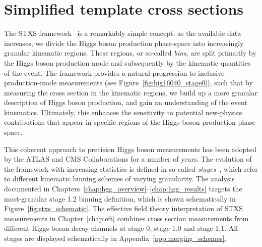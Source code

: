 \section{Simplified template cross sections}\label{sec:theory_stxs}
The STXS framework~\cite{deFlorian:2016spz} is a remarkably simple concept: as the available data increases, we divide the Higgs boson production phase-space into increasingly granular kinematic regions. These regions, or so-called \textit{bins}, are split primarily by the Higgs boson production mode and subsequently by the kinematic quantities of the event. The framework provides a natural progression to inclusive production-mode measurements (see Figure~\ref{fig:hig16040_stage0}), such that by measuring the cross section in the kinematic regions, we build up a more granular description of Higgs boson production, and gain an understanding of the event kinematics. Ultimately, this enhances the sensitivity to potential new-physics contributions that appear in specific regions of the Higgs boson production phase-space.

This coherent approach to precision Higgs boson measurements has been adopted by the ATLAS and CMS Collaborations for a number of years. The evolution of the framework with increasing statistics is defined in so-called \textit{stages}~\cite{deFlorian:2016spz,Berger:2019wnu}, which refer to different kinematic binning schemes of varying granularity. The \Hgg analysis documented in Chapters~\ref{chap:hgg_overview}--\ref{chap:hgg_results} targets the most-granular stage 1.2 binning definition, which is shown schematically in Figure~\ref{fig:stxs_schematic}. The effective field theory interpretation of STXS measurements in Chapter~\ref{chap:eft} combines cross section measurements from different Higgs boson decay channels at stage 0, stage 1.0 and stage 1.1. All stages are displayed schematically in Appendix~\ref{app:merging_schemes}.

